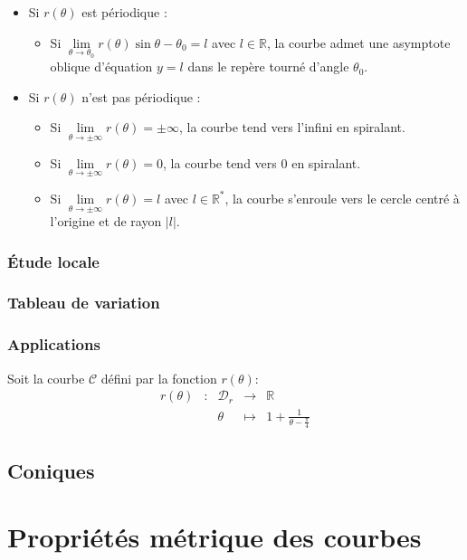 \begin{prop}
\begin{itemize}
    \item Si $r(\theta)$ est périodique :
    \begin{itemize}
        \item Si $\lim\limits_{\theta\to \theta_0}r(\theta)\sin{\theta-\theta_0}=l$ avec $l\in\mathbb{R}$, la courbe admet une asymptote oblique d'équation $y=l$ dans le repère tourné d'angle $\theta_0$.
    \end{itemize}
    \item Si $r(\theta)$ n'est pas périodique :
    \begin{itemize}
        \item Si $\lim\limits_{\theta\to\pm\infty}r(\theta)=\pm\infty$, la courbe tend vers l'infini en spiralant.
        \item Si $\lim\limits_{\theta\to\pm\infty}r(\theta)=0$, la courbe tend vers $0$ en spiralant.
        \item Si $\lim\limits_{\theta\to\pm\infty}r(\theta)=l$ avec $l\in\mathbb{R}^{*}$, la courbe s'enroule vers le cercle centré à l'origine et de rayon $|l|$.
    \end{itemize}
\end{itemize}
\end{prop}
\subsection{Étude locale}
\subsection{Tableau de variation}
\subsection{Applications}
\begin{ex}
Soit la courbe $\mathscr{C}$ défini par la fonction $r(\theta)$:
$$\begin{array}{ccccc}
    r(\theta) & : & \mathscr{D}_r & \to & \mathbb{R} \\
     & & \theta & \mapsto & 1+\frac{1}{\theta - \frac{\pi}{4}}
\end{array}$$
\end{ex}
\section{Coniques}
\chapter{Propriétés métrique des courbes}
